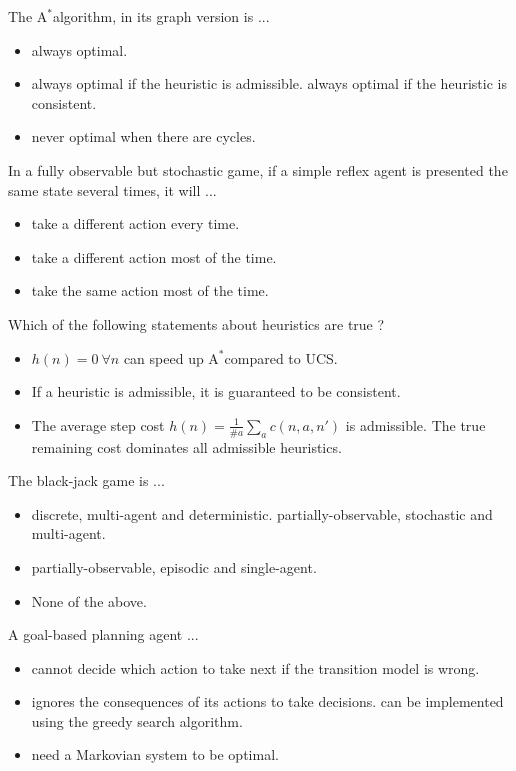 \documentclass[11pt, a4paper]{article}
\def\Astar{$\text{A}^*$}
\begin{document}
\newpage

\startquiz

The \Astar algorithm, in its graph version is ...
\begin{itemize}
    \item always optimal.
    \item always optimal if the heuristic is admissible.
    \solitem always optimal if the heuristic is consistent.
    \item never optimal when there are cycles.
\end{itemize}

In a fully observable but stochastic game, if a simple reflex agent is presented the same state several times, it will ...
\begin{itemize}
    \solitem take the same action every time.
    \item take a different action every time.
    \item take a different action most of the time.
    \item take the same action most of the time.
\end{itemize}

Which of the following statements about heuristics are true ?
\begin{itemize}
    \item $h(n) = 0 \ \forall n$ can speed up \Astar compared to UCS.
    \item If a heuristic is admissible, it is guaranteed to be consistent.
    \item The average step cost $h(n) = \frac{1}{\#a}\sum_a c(n,a,n')$ is admissible.
    \solitem The true remaining cost dominates all admissible heuristics.
\end{itemize}

The black-jack game is ...
\begin{itemize}
    \item discrete, multi-agent and deterministic.
    \solitem partially-observable, stochastic and multi-agent.
    \item partially-observable, episodic and single-agent.
    \item None of the above.
\end{itemize}

A goal-based planning agent ...
\begin{itemize}
    \item cannot decide which action to take next if the transition model is wrong.
    \item ignores the consequences of its actions to take decisions.
    \solitem can be implemented using the greedy search algorithm.
    \item need a Markovian system to be optimal.
\end{itemize}
\end{document}
